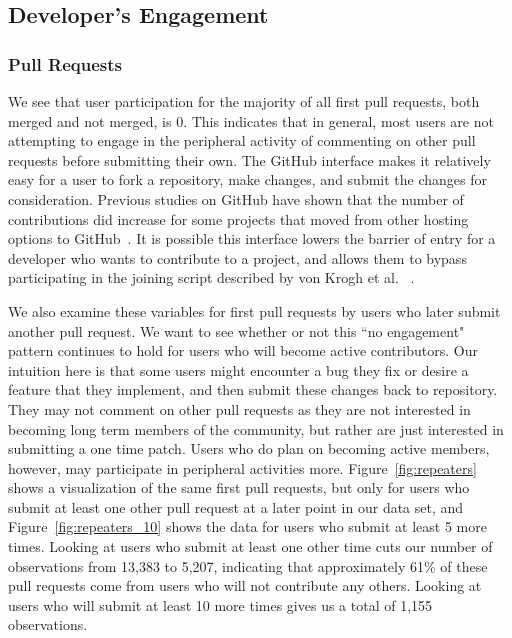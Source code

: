 \documentclass{sigchi}
\begin{document}
\subsection{Developer's Engagement} \label{results_engagement}

\subsubsection{Pull Requests}

We see that user participation for the majority of all first pull requests, both
merged and not merged, is 0. This indicates that in general, most users are not
attempting to engage in the peripheral activity of commenting on other pull
requests before submitting their own. The GitHub interface makes it relatively
easy for a user to fork a repository, make changes, and submit the changes for
consideration. Previous studies on GitHub have shown that the number of
contributions did increase for some projects that moved from other hosting
options to GitHub~\cite{mcdonald_performance_2013}. It is possible this
interface lowers the barrier of entry for a developer who wants to contribute to
a project, and allows them to bypass participating in the joining script
described by von Krogh et al. ~\cite{von_krogh_community_2003}.

We also examine these variables for first pull requests by users who later
submit another pull request. We want to see whether or not this ``no engagement"
pattern continues to hold for users who will become active contributors. Our
intuition here is that some users might encounter a bug they fix or desire a
feature that they implement, and then submit these changes back to repository.
They may not comment on other pull requests as they are not interested in
becoming long term members of the community, but rather are just interested in
submitting a one time patch. Users who do plan on becoming active members,
however, may participate in peripheral activities more.
Figure~\ref{fig:repeaters} shows a visualization of the same first pull
requests, but only for users who submit at least one other pull request at a
later point in our data set, and Figure~\ref{fig:repeaters_10} shows the data
for users who submit at least 5 more times. Looking at users who submit at least
one other time cuts our number of observations from 13,383 to 5,207, indicating
that approximately 61\% of these pull requests come from users who will not
contribute any others. Looking at users who will submit at least 10 more times
gives us a total of 1,155 observations.
\end{document}
